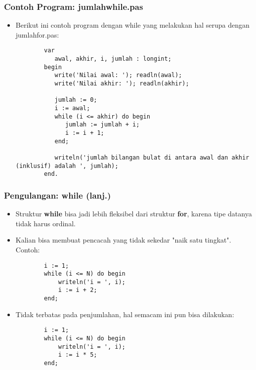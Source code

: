 \documentclass{beamer}
\begin{document}
\begin{frame}[fragile]
\frametitle{Contoh Program: jumlahwhile.pas}
\begin{itemize}
    \item Berikut ini contoh program dengan while yang melakukan hal serupa dengan jumlahfor.pas:
    \begin{lstlisting}
        var
           awal, akhir, i, jumlah : longint;
        begin
           write('Nilai awal: '); readln(awal);
           write('Nilai akhir: '); readln(akhir);

           jumlah := 0;
           i := awal;
           while (i <= akhir) do begin
              jumlah := jumlah + i;
              i := i + 1;
           end;

           writeln('jumlah bilangan bulat di antara awal dan akhir (inklusif) adalah ', jumlah);
        end.
    \end{lstlisting}
\end{itemize}
\end{frame}

\begin{frame}[fragile]
\frametitle{Pengulangan: while (lanj.)}
\begin{itemize}
    \item Struktur \textbf{while} bisa jadi lebih fleksibel dari struktur \textbf{for}, karena tipe datanya tidak harus ordinal.
    \item Kalian bisa membuat pencacah yang tidak sekedar "naik satu tingkat". Contoh:
    \begin{lstlisting}
        i := 1;
        while (i <= N) do begin
            writeln('i = ', i);
            i := i + 2;
        end;
    \end{lstlisting}

    \item Tidak terbatas pada penjumlahan, hal semacam ini pun bisa dilakukan:
    \begin{lstlisting}
        i := 1;
        while (i <= N) do begin
            writeln('i = ', i);
            i := i * 5;
        end;
    \end{lstlisting}
\end{itemize}
\end{frame}
\end{document}
